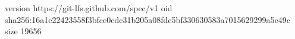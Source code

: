 version https://git-lfs.github.com/spec/v1
oid sha256:16a1e22423558f3bfce0cdc31b205a08fdc5bf330630583a7015629299a5c49c
size 19656

